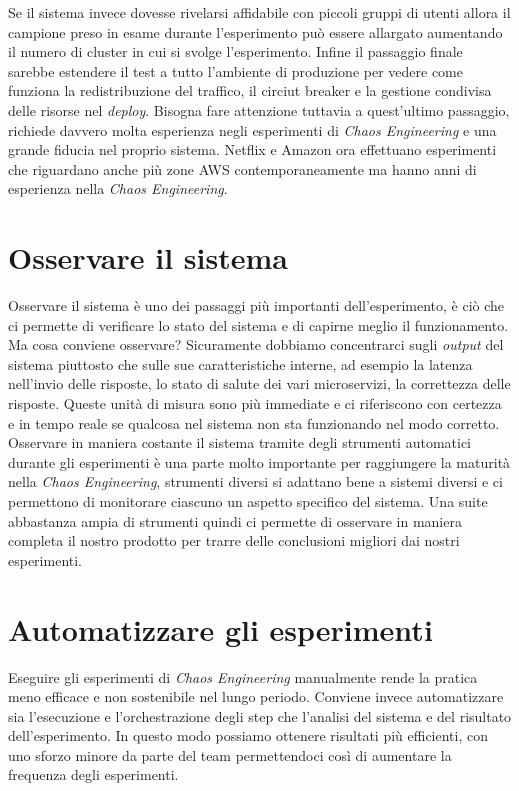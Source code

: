 Se il sistema invece dovesse rivelarsi affidabile con piccoli gruppi di utenti allora il campione preso in esame durante l'esperimento può essere allargato aumentando il numero di cluster in cui si svolge l'esperimento.
Infine il passaggio finale sarebbe estendere il test a tutto l'ambiente di produzione per vedere come funziona la redistribuzione del traffico, il circiut breaker e la gestione condivisa delle risorse nel \textit{deploy}.
Bisogna fare attenzione tuttavia a quest'ultimo passaggio, richiede davvero molta esperienza negli esperimenti di \textit{Chaos Engineering} e una grande fiducia nel proprio sistema.
Netflix e Amazon ora effettuano esperimenti che riguardano anche più zone AWS contemporaneamente ma hanno anni di esperienza nella \textit{Chaos Engineering}.

\section{Osservare il sistema}
Osservare il sistema è uno dei passaggi più importanti dell'esperimento, è ciò che ci permette di verificare lo stato del sistema e di capirne meglio il funzionamento.
Ma cosa conviene osservare? Sicuramente dobbiamo concentrarci sugli \textit{output} del sistema piuttosto che sulle sue caratteristiche interne, ad esempio la latenza nell'invio delle risposte, lo stato di salute dei vari microservizi, la correttezza delle risposte.
Queste unità di misura sono più immediate e ci riferiscono con certezza e in tempo reale se qualcosa nel sistema non sta funzionando nel modo corretto.
Osservare in maniera costante il sistema tramite degli strumenti automatici durante gli esperimenti è una parte molto importante per raggiungere la maturità nella \textit{Chaos Engineering}, strumenti diversi si adattano bene a sistemi diversi e ci permettono di monitorare ciascuno un aspetto specifico del sistema.
Una suite abbastanza ampia di strumenti quindi ci permette di osservare in maniera completa il nostro prodotto per trarre delle conclusioni migliori dai nostri esperimenti.


\section{Automatizzare gli esperimenti}
Eseguire gli esperimenti di \textit{Chaos Engineering} manualmente rende la pratica meno efficace e non sostenibile nel lungo periodo.
Conviene invece automatizzare sia l'esecuzione e l'orchestrazione degli step che l'analisi del sistema e del risultato dell'esperimento.
In questo modo possiamo ottenere risultati più efficienti, con uno sforzo minore da parte del team permettendoci così di aumentare la frequenza degli esperimenti.

